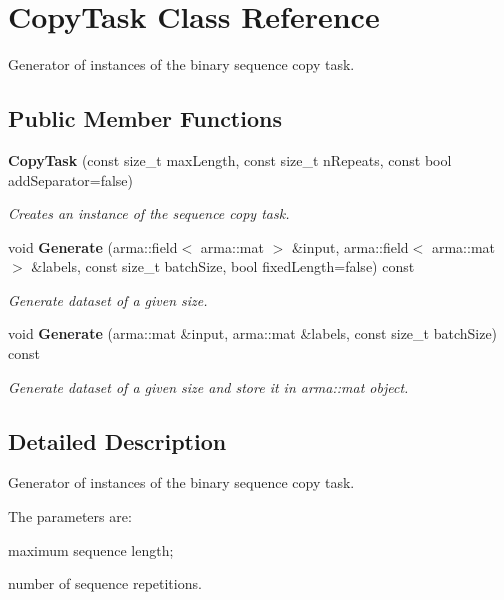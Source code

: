 \section{Copy\+Task Class Reference}
\label{classmlpack_1_1ann_1_1augmented_1_1tasks_1_1CopyTask}


Generator of instances of the binary sequence copy task.  


\subsection*{Public Member Functions}
\begin{DoxyCompactItemize}
\item 
\textbf{ Copy\+Task} (const size\+\_\+t max\+Length, const size\+\_\+t n\+Repeats, const bool add\+Separator=false)
\begin{DoxyCompactList}\small\item\em Creates an instance of the sequence copy task. \end{DoxyCompactList}\item 
void \textbf{ Generate} (arma\+::field$<$ arma\+::mat $>$ \&input, arma\+::field$<$ arma\+::mat $>$ \&labels, const size\+\_\+t batch\+Size, bool fixed\+Length=false) const
\begin{DoxyCompactList}\small\item\em Generate dataset of a given size. \end{DoxyCompactList}\item 
void \textbf{ Generate} (arma\+::mat \&input, arma\+::mat \&labels, const size\+\_\+t batch\+Size) const
\begin{DoxyCompactList}\small\item\em Generate dataset of a given size and store it in arma\+::mat object. \end{DoxyCompactList}\end{DoxyCompactItemize}


\subsection{Detailed Description}
Generator of instances of the binary sequence copy task. 

The parameters are\+:
\begin{DoxyItemize}
\item maximum sequence length;
\item number of sequence repetitions.
\end{DoxyItemize}

